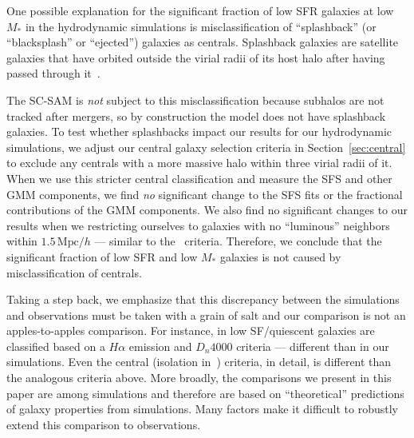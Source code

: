 \documentclass[preprint2,tighten]{aastex62}
\begin{document}
One possible explanation for the significant fraction of low SFR galaxies
at low $M_*$ in the hydrodynamic simulations is misclassification of 
``splashback'' (or ``blacksplash'' or ``ejected'') galaxies as centrals. 
Splashback galaxies are satellite galaxies that have orbited outside 
the virial radii of its host halo after having passed through 
it~\citep[\emph{e.g.}][]{mamon2004,gill2005,wang2009a,wetzel2014}.
{\color{red} The SC-SAM is {\em not} subject to this misclassification 
because subhalos are not tracked after mergers, so by construction the 
model does not have splashback galaxies. To test whether splashbacks 
impact our results for our hydrodynamic simulations, we adjust our central
galaxy selection criteria in Section~\ref{sec:central} to exclude 
any centrals with a more massive halo within three virial radii of it. 
When we use this stricter central classification and measure the
SFS and other GMM components, we find \emph{no} significant change to 
the SFS fits or the fractional contributions of the GMM components. 
We also find no significant changes to our results when we restricting 
ourselves to galaxies with no ``luminous'' neighbors within 
$1.5\,\mathrm{Mpc}/h$ --- similar to the~\cite{geha2012} criteria.
Therefore, we conclude that the significant fraction of low SFR and 
low $M_*$ galaxies is not caused by misclassification of centrals.


Taking a step back, we emphasize that this discrepancy between the 
simulations and observations must be taken with a grain of salt and
our comparison is not an apples-to-apples comparison. For instance,
in \cite{geha2012} low SF/quiescent galaxies are classified based on 
a $H\alpha$ emission and $D_n 4000$ criteria --- different than in 
our simulations. Even the central (isolation in~\citealt{geha2012}) 
criteria, in detail, is different than the analogous criteria 
above. More broadly, the comparisons we present in this paper are 
among simulations and therefore are based on ``theoretical'' predictions 
of galaxy properties from simulations. Many factors make it difficult 
to robustly extend this comparison to observations. 

}
\end{document}
